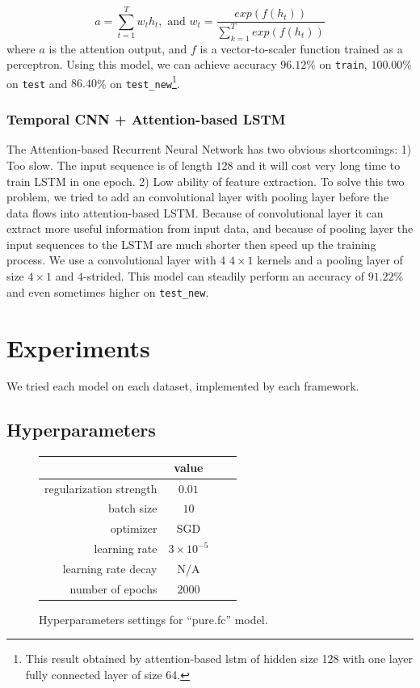 \documentclass[a4paper]{article}
\begin{document}
\[ a = \sum_{t = 1}^{T} w_{t} h_t, \text{ and } w_{t} = \frac{exp(f(h_t))}{\sum_{k = 1}^{T}exp(f(h_t))}\]
where $a$ is the attention output, and $f$ is a vector-to-scaler function trained as a perceptron. Using this model, we can achieve accuracy $96.12\%$ on \texttt{train}, $100.00\%$ on  \texttt{test} and $86.40$\% on \texttt{test\_new}\footnote{This result obtained by attention-based lstm of hidden size 128 with one layer fully connected layer of size 64.}.

\subsubsection{Temporal CNN + Attention-based LSTM}
The Attention-based Recurrent Neural Network has two obvious shortcomings: 1) Too slow. The input sequence is of length $128$ and it will cost very long time to train LSTM in one epoch. 2) Low ability of feature extraction. To solve this two problem, we tried to add an convolutional layer with pooling layer before the data flows into attention-based LSTM. Because of convolutional layer it can extract more useful information from input data, and because of pooling layer the input sequences to the LSTM are much shorter then speed up the training process.
We use a convolutional layer with 4 $4\times 1$ kernels and a pooling layer of size $4 \times 1$ and $4$-strided. This model can steadily perform an accuracy of $91.22$\% and even sometimes higher on \texttt{test\_new}.

\section{Experiments}

We tried each model on each dataset, implemented by each framework.

\subsection{Hyperparameters}

\begin{figure}[H]
\centering
\begin{tabular}{|r|c|c|c|}
\hline
 & value \\
\hline
regularization strength & $0.01$ \\
\hline
batch size & $10$ \\
\hline
optimizer & SGD \\
\hline
learning rate & $3\times10^{-5}$\\
\hline
learning rate decay & N/A \\
\hline
number of epochs & $2000$ \\
\hline
\end{tabular}
\caption{Hyperparameters settings for ``pure.fc'' model.}
\end{figure}
\end{document}
